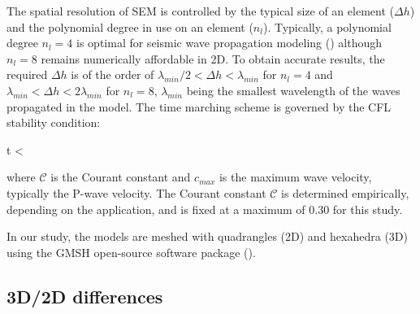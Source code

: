 \documentclass[extra,mreferee]{gji}
\begin{document}
The spatial resolution of SEM is controlled by the typical size of an element ($\Delta h$) and the polynomial degree in use on an element ($n_{l}$). Typically, a polynomial degree $n_{l}=4$ is optimal for seismic wave propagation modeling (\cite{moczo2011finite}) although $n_{l}=8$ remains numerically affordable in 2D. To obtain accurate results, the required $\Delta h$ is of the order of $\lambda_{min} /2 < \Delta h < \lambda_{min}$ for $n_{l}=4$ and $\lambda_{min} < \Delta h < 2\lambda_{min}$ for $n_{l}=8$, $\lambda_{min}$ being the smallest wavelength of the waves propagated in the model. The time marching scheme is governed by the CFL stability condition:

\equation
\Delta t < \,
\endequation

where $\mathcal{C}$ is the Courant constant and $c_{max}$ is the maximum wave velocity, typically the P-wave velocity. The Courant constant $\mathcal{C}$ is determined empirically, depending on the application, and is fixed at a maximum of 0.30 for this study.

In our study, the models are meshed with quadrangles (2D) and hexahedra (3D) using the GMSH open-source software package (\cite{Geuzaine_MSH_2009}).

\subsection{3D/2D differences}
\end{document}
